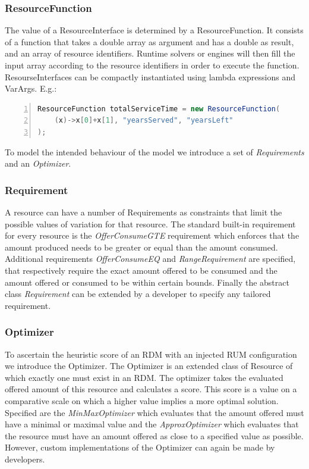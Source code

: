 \subsubsection{ResourceFunction}
The value of a ResourceInterface is determined by a ResourceFunction. It consists of a function that takes a double array as argument and has a double as result, and an array of resource identifiers. Runtime solvers or engines will then fill the input array according to the resource identifiers in order to execute the function. ResourseInterfaces can be compactly instantiated using lambda expressions and VarArgs. E.g.:
\begin{lstlisting}[language=java, frame=single, numbers=left, tabsize=4, basicstyle=\small]
ResourceFunction totalServiceTime = new ResourceFunction(
	(x)->x[0]+x[1], "yearsServed", "yearsLeft"
);
\end{lstlisting}

To model the intended behaviour of the model we introduce a set of \emph{Requirements} and an \emph{Optimizer}.
\subsubsection{Requirement}
A resource can have a number of Requirements as constraints that limit the possible values of variation for that resource. The standard built-in requirement for every resource is the \emph{OfferConsumeGTE} requirement which enforces that the amount produced needs to be greater or equal than the amount consumed. Additional requirements \emph{OfferConsumeEQ} and \emph{RangeRequirement} are specified, that respectively require the exact amount offered to be consumed and the amount offered or consumed to be within certain bounds. Finally the abstract class \emph{Requirement} can be extended by a developer to specify any tailored requirement.
\subsubsection{Optimizer}
To ascertain the heuristic score of an RDM with an injected RUM configuration we introduce the Optimizer. The Optimizer is an extended class of Resource of which exactly one must exist in an RDM. The optimizer takes the evaluated offered amount of this resource and calculates a score. This score is a value on a comparative scale on which a higher value implies a more optimal solution. Specified are the \emph{MinMaxOptimizer} which evaluates that the amount offered must have a minimal or maximal value and the \emph{ApproxOptimizer} which evaluates that the resource must have an amount offered as close to a specified value as possible. However, custom implementations of the Optimizer can again be made by developers.

